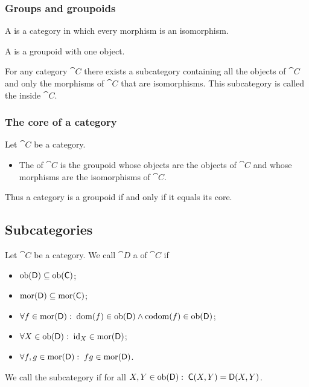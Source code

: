 \subsubsection{Groups and groupoids}
\begin{definition}
A  is a category in which every morphism is an isomorphism.

A  is a groupoid with one object.
\end{definition}

\begin{lemma}
For any category $\cat{C}$ there exists a subcategory containing all the objects of $\cat{C}$ and only the morphisms of $\cat{C}$ that are isomorphisms. This subcategory is called the  inside $\cat{C}$.
\end{lemma}

\subsubsection{The core of a category}
\begin{definition}
Let $\cat{C}$ be a category.
\begin{itemize}
\item The  of $\cat{C}$ is the groupoid whose objects are the objects of $\cat{C}$ and whose morphisms are the isomorphisms of $\cat{C}$.
\end{itemize}
\end{definition}

Thus a category is a groupoid if and only if it equals its core.

\subsection{Subcategories}
\begin{definition}
Let $\cat{C}$ be a category. We call $\cat{D}$ a  of $\cat{C}$ if
\begin{itemize}
\item $\operatorname{ob}(\mathsf{D}) \subseteq \operatorname{ob}(\mathsf{C})$;
\item $\operatorname{mor}(\mathsf{D}) \subseteq \operatorname{mor}(\mathsf{C})$;
\item $\forall f\in \operatorname{mor}(\mathsf{D}): \; \operatorname{dom}(f)\in\operatorname{ob}(\mathsf{D}) \land \operatorname{codom}(f)\in\operatorname{ob}(\mathsf{D})$;
\item $\forall X\in \operatorname{ob}(\mathsf{D}): \; \operatorname{id}_X\in \operatorname{mor}(\mathsf{D})$;
\item $\forall f,g \in \operatorname{mor}(\mathsf{D}): \; fg \in \operatorname{mor}(\mathsf{D})$.
\end{itemize}
We call the subcategory  if for all $X,Y\in \operatorname{ob}(\mathsf{D}): \; \mathsf{C}(X,Y) = \mathsf{D}(X,Y)$.
\end{definition}

